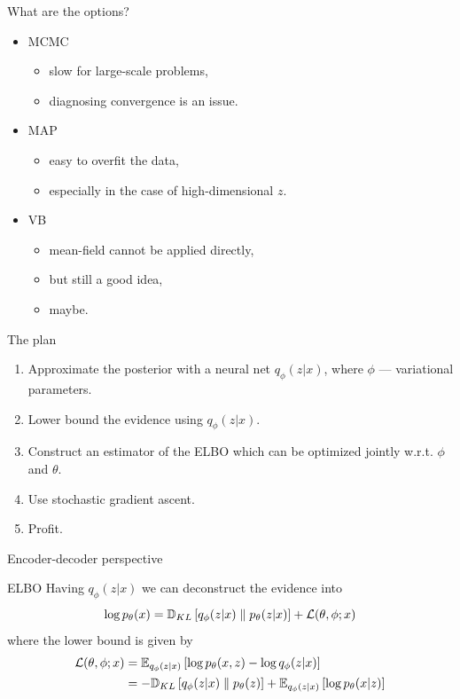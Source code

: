 \documentclass[unicode,11pt]{beamer}
\begin{document}
\begin{frame}{What are the options?}
  \begin{itemize}
  \item MCMC
    \begin{itemize}
    \item slow for large-scale problems,
    \item diagnosing convergence is an issue.
    \end{itemize}
  \item MAP
    \begin{itemize}
    \item easy to overfit the data,
    \item especially in the case of high-dimensional $z$.
    \end{itemize}
  \item VB
    \begin{itemize}
    \item mean-field cannot be applied directly,
    \item but still a good idea,
    \item maybe.
    \end{itemize}
  \end{itemize}
\end{frame}


\begin{frame}{The plan}
  \begin{enumerate}
  \item Approximate the posterior with a neural net
    $q_{\phi}(z|x)$, where $\phi$ --- variational parameters.
  \item Lower bound the evidence using $q_{\phi}(z|x)$.
  \item Construct an estimator of the ELBO which can be
    optimized jointly w.r.t. $\phi$ and $\theta$.
  \item Use stochastic gradient ascent.
  \item Profit.
  \end{enumerate}
\end{frame}


\begin{frame}{Encoder-decoder perspective}
\end{frame}


\begin{frame}{ELBO}
  Having $q_\phi(z|x)$ we can deconstruct the evidence into
  $$
  \log p_\theta(x) = \mathbb{D}_{KL}\left[ q_\phi(z|x) \parallel p_\theta(z|x) \right] + \mathcal{L}(\theta, \phi; x)
  $$
  where the lower bound is given by
  \begin{align*}
    \mathcal{L}(\theta, \phi; x)
    &= \E{q_\phi(z|x)}{\log p_\theta(x, z) - \log q_\phi(z|x)} \\
    &= -\KL{q_\phi (z|x)}{p_\theta(z)} + \E{q_\phi(z|x)}{\log p_\theta (x|z)}
  \end{align*}

\end{frame}
\end{document}
